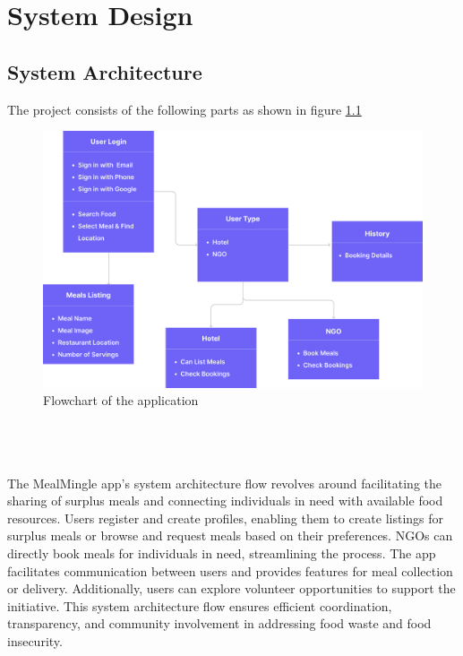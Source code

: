 \chapter{System Design}
\section{System Architecture}
The project consists of the following parts as shown in figure \ref{sd1}
\begin{figure}[h]
    \centering
    \includegraphics[width=\textwidth]{flowchart.png}
    \caption{Flowchart of the application}
    \label{sd1}
\end{figure}
\\
\\
\\

The MealMingle app's system architecture flow revolves around facilitating the sharing of surplus meals and connecting individuals in need with available food resources. Users register and create profiles, enabling them to create listings for surplus meals or browse and request meals based on their preferences. NGOs can directly book meals for individuals in need, streamlining the process. The app facilitates communication between users and provides features for meal collection or delivery. Additionally, users can explore volunteer opportunities to support the initiative. This system architecture flow ensures efficient coordination, transparency, and community involvement in addressing food waste and food insecurity.